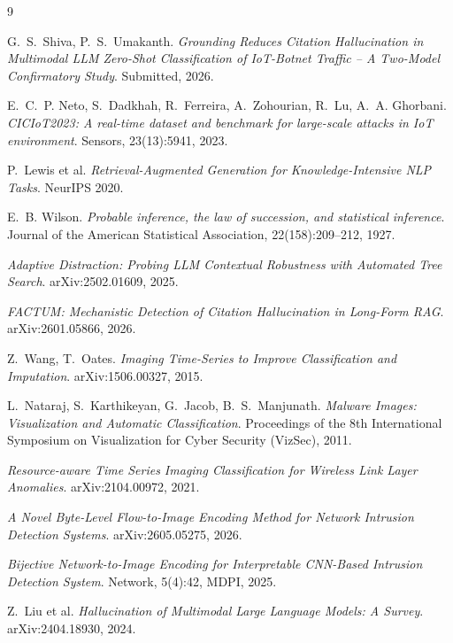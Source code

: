 \documentclass[11pt]{article}
\begin{document}
\begin{thebibliography}{9}

G.~S.~Shiva, P.~S.~Umakanth.
\textit{Grounding Reduces Citation Hallucination in Multimodal LLM Zero-Shot Classification of
IoT-Botnet Traffic -- A Two-Model Confirmatory Study}. Submitted, 2026.

E.~C.~P. Neto, S.~Dadkhah, R.~Ferreira, A.~Zohourian, R.~Lu, A.~A. Ghorbani.
\textit{CICIoT2023: A real-time dataset and benchmark for large-scale attacks in IoT
environment}. Sensors, 23(13):5941, 2023.

P.~Lewis et al.
\textit{Retrieval-Augmented Generation for Knowledge-Intensive NLP Tasks}.
NeurIPS 2020.

E.~B. Wilson.
\textit{Probable inference, the law of succession, and statistical inference}.
Journal of the American Statistical Association, 22(158):209--212, 1927.

\textit{Adaptive Distraction: Probing LLM Contextual Robustness with Automated Tree Search}.
arXiv:2502.01609, 2025.

\textit{FACTUM: Mechanistic Detection of Citation Hallucination in Long-Form RAG}.
arXiv:2601.05866, 2026.

Z.~Wang, T.~Oates.
\textit{Imaging Time-Series to Improve Classification and Imputation}.
arXiv:1506.00327, 2015.

L.~Nataraj, S.~Karthikeyan, G.~Jacob, B.~S.~Manjunath.
\textit{Malware Images: Visualization and Automatic Classification}.
Proceedings of the 8th International Symposium on Visualization for Cyber Security (VizSec), 2011.

\textit{Resource-aware Time Series Imaging Classification for Wireless Link Layer Anomalies}.
arXiv:2104.00972, 2021.

\textit{A Novel Byte-Level Flow-to-Image Encoding Method for Network Intrusion Detection Systems}.
arXiv:2605.05275, 2026.

\textit{Bijective Network-to-Image Encoding for Interpretable CNN-Based Intrusion Detection System}.
Network, 5(4):42, MDPI, 2025.

Z.~Liu et al.
\textit{Hallucination of Multimodal Large Language Models: A Survey}.
arXiv:2404.18930, 2024.

\end{thebibliography}
\end{document}
